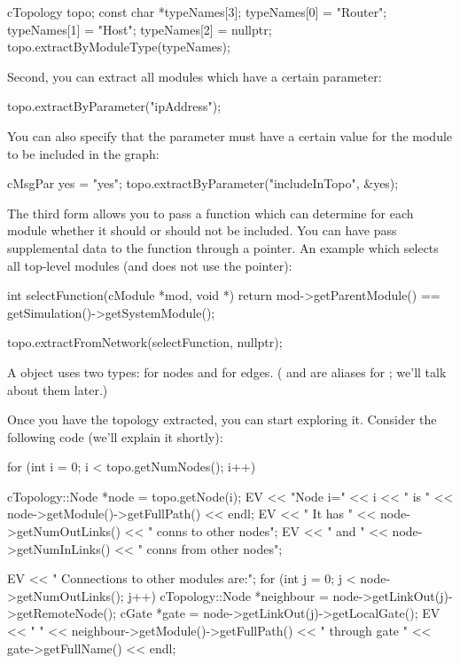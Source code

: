 \begin{cpp}
cTopology topo;
const char *typeNames[3];
typeNames[0] = "Router";
typeNames[1] = "Host";
typeNames[2] = nullptr;
topo.extractByModuleType(typeNames);
\end{cpp}

Second, you can extract all modules which have a certain parameter:

\begin{cpp}
topo.extractByParameter("ipAddress");
\end{cpp}

You can also specify that the parameter must have a certain value
for the module to be included in the graph:

\begin{cpp}
cMsgPar yes = "yes";
topo.extractByParameter("includeInTopo", &yes);
\end{cpp}

The third form allows you to pass a function which can determine for
each module whether it should or should not be included.  You can have
 pass supplemental data to the function through a
 pointer. An example which selects all top-level modules (and
does not use the  pointer):

\begin{cpp}
int selectFunction(cModule *mod, void *)
{
  return mod->getParentModule() == getSimulation()->getSystemModule();
}

topo.extractFromNetwork(selectFunction, nullptr);
\end{cpp}

%
%

A  object uses two types:  for
nodes and  for edges. ( and
 are aliases for ; we'll
talk about them later.)

Once you have the topology extracted, you can start exploring
it. Consider the following code (we'll explain it shortly):

\begin{cpp}
for (int i = 0; i < topo.getNumNodes(); i++) {
  cTopology::Node *node = topo.getNode(i);
  EV << "Node i=" << i << " is " << node->getModule()->getFullPath() << endl;
  EV << " It has " << node->getNumOutLinks() << " conns to other nodes\n";
  EV << " and " << node->getNumInLinks() << " conns from other nodes\n";

  EV << " Connections to other modules are:\n";
  for (int j = 0; j < node->getNumOutLinks(); j++) {
    cTopology::Node *neighbour = node->getLinkOut(j)->getRemoteNode();
    cGate *gate = node->getLinkOut(j)->getLocalGate();
    EV << " " << neighbour->getModule()->getFullPath()
       << " through gate " << gate->getFullName() << endl;
  }
}
\end{cpp}

